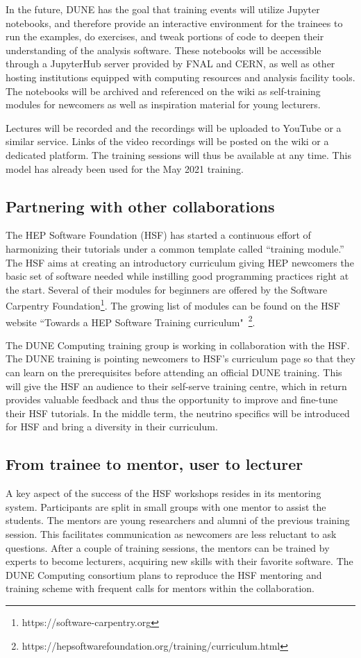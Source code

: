 \documentclass[../main-v1.tex]{subfiles}
\begin{document}
In the future, DUNE has the goal that training events will utilize Jupyter notebooks, and therefore provide an interactive environment for the trainees to run the examples, do exercises, and tweak portions of code to deepen their understanding of the analysis software. These notebooks will be accessible through a JupyterHub server provided by FNAL and CERN, as well as other hosting institutions equipped with computing resources and analysis facility tools. The notebooks will be archived and referenced on the wiki as self-training modules for newcomers as well as inspiration material for young lecturers.

Lectures will be recorded and the recordings will be uploaded to YouTube or a similar service.  Links of the video recordings will be posted on the wiki or a dedicated platform. The training sessions will thus be available at any time.  This model has already been used for the May 2021 training.

\subsection{Partnering with other collaborations}
The HEP Software Foundation (HSF) has started a continuous effort of harmonizing their tutorials under a common template called “training module.” The HSF aims at creating an introductory curriculum giving HEP newcomers the basic set of software needed while instilling good programming practices right at the start. Several of their modules for beginners are offered by the Software Carpentry Foundation\footnote{https://software-carpentry.org }. The growing list of modules can be found on the HSF website “Towards a HEP Software Training curriculum"~\footnote{https://hepsoftwarefoundation.org/training/curriculum.html}.

The DUNE Computing training group is working in collaboration with the HSF. The DUNE training is pointing newcomers to HSF's curriculum page so that they can learn on the prerequisites before attending an official DUNE training. This will give the HSF an audience to their self-serve training centre, which in return provides valuable feedback and thus the opportunity to improve and fine-tune their HSF tutorials. In the middle term, the neutrino specifics will be introduced for HSF and bring a diversity in their curriculum.

\subsection{From trainee to mentor, user to lecturer}
A key aspect of the success of the HSF workshops resides in its mentoring system. Participants are split in small groups with one mentor to assist the students. The mentors are young researchers and alumni of the previous training session. This facilitates communication as newcomers are less reluctant to ask questions. After a couple of training sessions, the mentors can be trained by experts to become lecturers, acquiring new skills with their favorite software. The DUNE Computing consortium plans to reproduce the HSF mentoring and training scheme with frequent calls for mentors within the collaboration.
\end{document}
